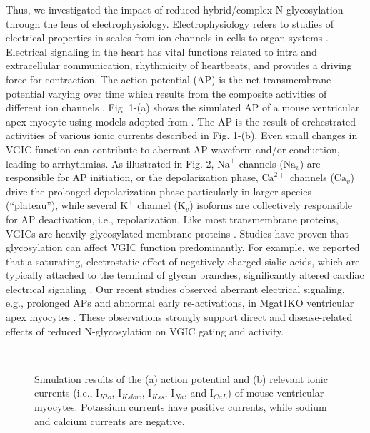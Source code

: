 \documentclass[journal]{IEEEtran}
\begin{document}
Thus, we investigated the impact of reduced hybrid/complex N-glycosylation through the lens of electrophysiology. Electrophysiology refers to studies of electrical properties in scales from ion channels in cells to organ systems \cite{scanziani2009electrophysiology}. Electrical signaling in the heart has vital functions related to intra and extracellular communication, rhythmicity of heartbeats, and provides a driving force for contraction. The action potential (AP) is the net transmembrane potential varying over time which results from the composite activities of different ion channels \cite{grant2009cardiac}. Fig. 1-(a) shows the simulated AP of a mouse ventricular apex myocyte using models adopted from \cite{bondarenko2004computer}. The AP is the result of orchestrated activities of various ionic currents described in Fig. 1-(b). Even small changes in VGIC function can contribute to aberrant AP waveform and/or conduction, leading to arrhythmias. As illustrated in Fig. 2, $\text{Na}^{+}$ channels ($\text{Na}_{v}$) are responsible for AP initiation, or the depolarization phase, $\text{Ca}^{2+}$ channels ($\text{Ca}_{v}$) drive the prolonged depolarization phase particularly in larger species (“plateau”), while several $\text{K}^{+}$ channel ($\text{K}_{v}$) isoforms are collectively responsible for AP deactivation, i.e., repolarization. Like most transmembrane proteins, VGICs are heavily glycosylated membrane proteins \cite{ednie2011modulation}. Studies have proven that glycosylation can affect VGIC function predominantly. For example, we reported that a saturating, electrostatic effect of negatively charged sialic acids, which are typically attached to the terminal of glycan branches, significantly altered cardiac electrical signaling \cite{ednie2013expression, ednie2015reduced}. Our recent studies observed aberrant electrical signaling, e.g., prolonged APs and abnormal early re-activations, in Mgat1KO ventricular apex myocytes \cite{ednie2019reduced, ednie2019reduced2}. These observations strongly support direct and disease-related effects of reduced N-glycosylation on VGIC gating and activity.
\begin{figure}
    \label{fig1}
    \centering
    \\
    \caption{Simulation results of the (a) action potential and (b) relevant ionic currents (i.e., $\text{I}_{Kto}$, $\text{I}_{Kslow}$, $\text{I}_{Kss}$, $\text{I}_{Na}$, and $\text{I}_{CaL}$) of mouse ventricular myocytes. Potassium currents have positive currents, while sodium and calcium currents are negative.}
\end{figure}
\end{document}
